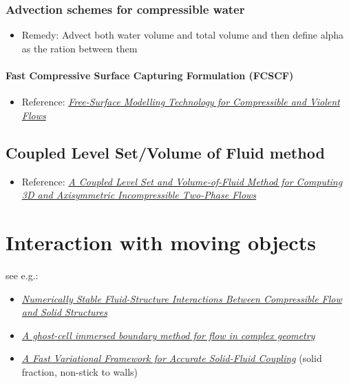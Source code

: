 \documentclass[]{report}
\begin{document}
\subsection{Advection schemes for compressible water}

\begin{itemize}
    \item Remedy: Advect both water volume and total volume and then define alpha as the ration between them
\end{itemize}

\subsubsection{Fast Compressive Surface Capturing Formulation (FCSCF)}

\begin{itemize}
    \item Reference: \textit{\href{http://researchspace.csir.co.za/dspace/bitstream/10204/5282/1/Heyns_2011.pdf}{Free-Surface Modelling Technology for Compressible and Violent Flows}}
\end{itemize}

\section{Coupled Level Set/Volume of Fluid  method}

\begin{itemize}
    \item Reference: \textit{\href{http://pages.csam.montclair.edu/~yecko/icodes/SussmanPuckett_LevelSetVOF.pdf}{A Coupled Level Set and Volume-of-Fluid Method for Computing 3D and Axisymmetric Incompressible Two-Phase Flows}}
\end{itemize}

\chapter{Interaction with moving objects}

see e.g.:

\begin{itemize}
    \item \textit{\href{http://physbam.stanford.edu/~fedkiw/papers/stanford2010-04.pdf}{Numerically Stable Fluid-Structure Interactions Between Compressible Flow and Solid Structures}}
    \item \textit{\href{http://efdl.as.ntu.edu.tw/research/papers/JCP03GCIBM.pdf}{A ghost-cell immersed boundary method for flow in complex geometry}}
    \item \textit{\href{http://www.cs.columbia.edu/~batty/papers/Batty07.pdf}{A Fast Variational Framework for Accurate Solid-Fluid Coupling}} (solid fraction, non-stick to walls)
\end{itemize}
\end{document}
